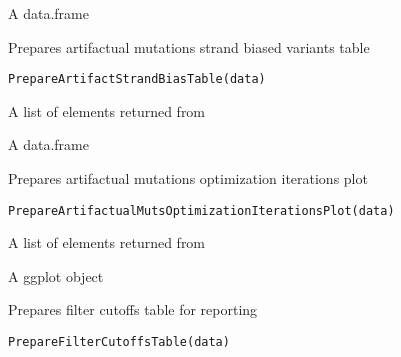 \documentclass[letterpaper]{book}
\begin{document}
%
\begin{Value}
A data.frame
\end{Value}
%
\begin{Description}\relax
Prepares artifactual mutations strand biased variants table
\end{Description}
%
\begin{Usage}
\begin{verbatim}
PrepareArtifactStrandBiasTable(data)
\end{verbatim}
\end{Usage}
%
\begin{Arguments}
\begin{ldescription}
\item[\code{data}] A list of elements returned from 
\end{ldescription}
\end{Arguments}
%
\begin{Value}
A data.frame
\end{Value}
%
\begin{Description}\relax
Prepares artifactual mutations optimization iterations plot
\end{Description}
%
\begin{Usage}
\begin{verbatim}
PrepareArtifactualMutsOptimizationIterationsPlot(data)
\end{verbatim}
\end{Usage}
%
\begin{Arguments}
\begin{ldescription}
\item[\code{data}] A list of elements returned from 
\end{ldescription}
\end{Arguments}
%
\begin{Value}
A ggplot object
\end{Value}
%
\begin{Description}\relax
Prepares filter cutoffs table for reporting
\end{Description}
%
\begin{Usage}
\begin{verbatim}
PrepareFilterCutoffsTable(data)
\end{verbatim}
\end{Usage}
\end{document}

